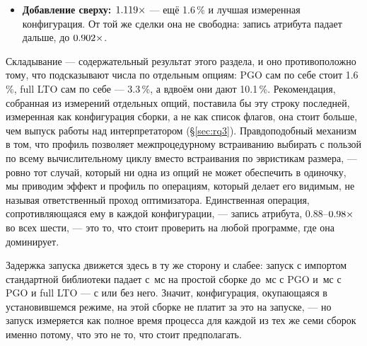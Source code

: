 \begin{itemize}[leftmargin=1.4em,itemsep=1pt]
        $\meas{ratio:b5_buildcfg-plain:float_arith/plain|b5_buildcfg-pgo_ltofull:float_arith/pgo_ltofull}{1.172}\times$. Хуже становится только запись атрибута ($\meas{ratio:b5_buildcfg-plain:attr_set/plain|b5_buildcfg-pgo_ltofull:attr_set/pgo_ltofull}{0.928}\times$), а 
        ($\meas{ratio:b5_buildcfg-plain:list_append/plain|b5_buildcfg-pgo_ltofull:list_append/pgo_ltofull}{0.990}\times$, $t=-3.86$) и присваивание в  ($\meas{ratio:b5_buildcfg-plain:dict_setitem/plain|b5_buildcfg-pgo_ltofull:dict_setitem/pgo_ltofull}{1.007}\times$, $t=4.21$) сдвигаются
        менее чем на $1\%$, оба различия критерий разрешает.
  \item \textbf{Добавление  сверху: $\meas{geomean:b5_buildcfg-plain|b5_buildcfg-pgo_ltofull_native}{1.119}\times$} --- ещё 1.6\,\% и лучшая
        измеренная конфигурация. От той же сделки она не свободна: запись атрибута падает дальше,
        до $\meas{ratio:b5_buildcfg-plain:attr_set/plain|b5_buildcfg-pgo_ltofull_native:attr_set/pgo_ltofull_native}{0.902}\times$.
\end{itemize}

Складывание --- содержательный результат этого раздела, и оно противоположно тому, что подсказывают
числа по отдельным опциям: PGO сам по себе стоит 1.6\,\%, full LTO сам по себе --- 3.3\,\%, а вдвоём
они дают 10.1\,\%. Рекомендация, собранная из измерений отдельных опций, поставила бы эту строку
последней, измеренная как конфигурация сборки, а не как список флагов, она стоит больше, чем выпуск
работы над интерпретатором (\S\ref{sec:rq3}). Правдоподобный механизм в том, что профиль позволяет
межпроцедурному встраиванию выбирать с пользой по всему вычислительному циклу вместо встраивания по
эвристикам размера, --- ровно тот случай, который ни одна из опций не может обеспечить в одиночку,
мы приводим эффект и профиль по операциям, который делает его видимым, не называя ответственный
проход оптимизатора. Единственная операция, сопротивляющаяся ему в каждой конфигурации, --- запись
атрибута, $0.88$--$\meas{ratio:b5_buildcfg-plain:attr_set/plain|b5_buildcfg-pgo:attr_set/pgo}{0.98}\times$ во всех шести, --- это то, что стоит проверить на любой программе,
где она доминирует.

Задержка запуска движется здесь в ту же сторону и слабее: запуск с импортом стандартной библиотеки
падает с \,мс на простой сборке до \,мс с PGO и \,мс с PGO и full LTO --- с
 или без него. Значит, конфигурация, окупающаяся в установившемся режиме, на
этой сборке не платит за это на запуске, --- но запуск измеряется как полное время процесса для
каждой из тех же семи сборок именно потому, что это не то, что стоит предполагать.

